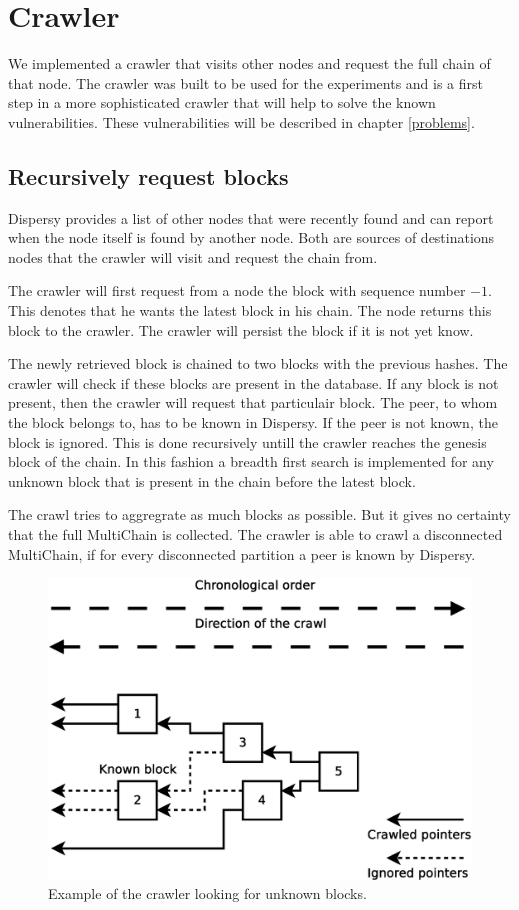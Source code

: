 \section{Crawler}
We implemented a crawler that visits other nodes and request the full chain of that node.
The crawler was built to be used for the experiments and
is a first step in a more sophisticated crawler that will help to solve the known vulnerabilities.
These vulnerabilities will be described in chapter \ref{problems}.

\subsection{Recursively request blocks}
Dispersy provides a list of other nodes that were recently found
and can report when the node itself is found by another node.
Both are sources of destinations nodes that the crawler will visit
and request the chain from.

The crawler will first request from a node the block with sequence number $-1$.
This denotes that he wants the latest block in his chain.
The node returns this block to the crawler.
The crawler will persist the block if it is not yet know.

The newly retrieved block is chained to two blocks with the previous hashes.
The crawler will check if these blocks are present in the database.
If any block is not present,
then the crawler will request that particulair block.
The peer, to whom the block belongs to, has to be known in Dispersy.
If the peer is not known, the block is ignored.
This is done recursively untill the crawler reaches the genesis block of the chain.
In this fashion a breadth first search is implemented for any unknown block
that is present in the chain before the latest block.

The crawl tries to aggregrate as much blocks as possible.
But it gives no certainty that the full MultiChain is collected.
The crawler is able to crawl a disconnected MultiChain,
if for every disconnected partition a peer is known by Dispersy.

\begin{figure}
	\centerline{\includegraphics[scale=0.3]{design/figs/crawler.eps}}
	\caption{Example of the crawler looking for unknown blocks.}
	\label{fig:crawler-example}
\end{figure}


